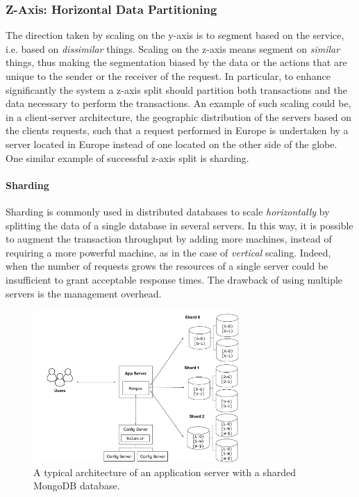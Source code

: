 \subsubsection{Z-Axis: Horizontal Data Partitioning}

The direction taken by scaling on the y-axis is to segment based on the service,
i.e. based on \emph{dissimilar} things. Scaling on the z-axis means segment on
\emph{similar} things, thus making the segmentation biased by the data or the
actions that are unique to the sender or the receiver of the request. In
particular, to enhance significantly the system a z-axis split should partition
both transactions and the data necessary to perform the transactions. 
An example of such scaling could be, in a client-server architecture, the 
geographic distribution of the servers based on the clients requests, such that 
a request performed in Europe is undertaken by a server located in Europe 
instead of one located on the other side of the globe. One similar example of
successful z-axis split is sharding.

\paragraph{Sharding}
Sharding is commonly used in distributed databases to scale \emph{horizontally}
by splitting the data of a single database in several servers. In this way, it
is possible to augment the transaction throughput by adding more machines, 
instead of requiring a more powerful machine, as in the case of \emph{vertical} 
scaling.
Indeed, when the number of requests grows the resources of a single server
could be insufficient to grant acceptable response times. The drawback of using
multiple servers is the management overhead.


\begin{figure}
    \begin{center}
        \includegraphics[width=0.7\textwidth]{./res/img/mongodb}
        \caption{A typical architecture of an application server with a sharded
        MongoDB database.}
        \label{fig:mongodb}
    \end{center}
\end{figure}


